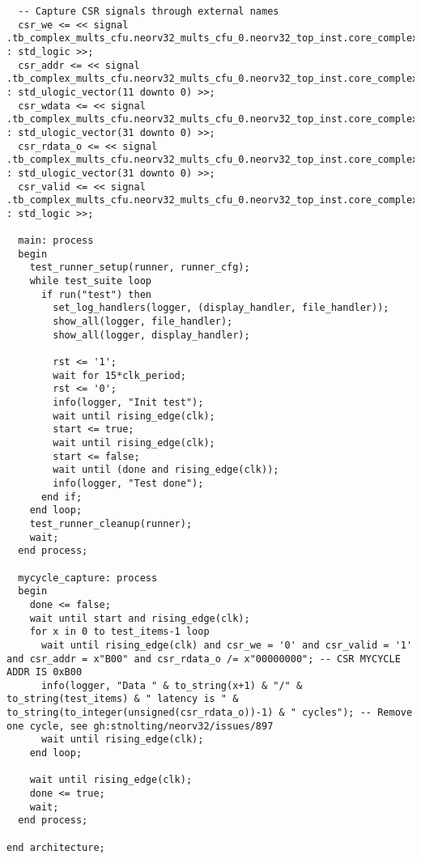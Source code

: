 \begin{code}
\begin{verbatim}
  -- Capture CSR signals through external names
  csr_we <= << signal .tb_complex_mults_cfu.neorv32_mults_cfu_0.neorv32_top_inst.core_complex.neorv32_cpu_inst.neorv32_cpu_control_inst.xcsr_we_o : std_logic >>;
  csr_addr <= << signal .tb_complex_mults_cfu.neorv32_mults_cfu_0.neorv32_top_inst.core_complex.neorv32_cpu_inst.neorv32_cpu_control_inst.xcsr_addr_o : std_ulogic_vector(11 downto 0) >>;
  csr_wdata <= << signal .tb_complex_mults_cfu.neorv32_mults_cfu_0.neorv32_top_inst.core_complex.neorv32_cpu_inst.neorv32_cpu_control_inst.xcsr_wdata_o : std_ulogic_vector(31 downto 0) >>;
  csr_rdata_o <= << signal .tb_complex_mults_cfu.neorv32_mults_cfu_0.neorv32_top_inst.core_complex.neorv32_cpu_inst.neorv32_cpu_control_inst.csr_rdata_o : std_ulogic_vector(31 downto 0) >>;
  csr_valid <= << signal .tb_complex_mults_cfu.neorv32_mults_cfu_0.neorv32_top_inst.core_complex.neorv32_cpu_inst.neorv32_cpu_control_inst.csr_reg_valid : std_logic >>;

  main: process
  begin
    test_runner_setup(runner, runner_cfg);
    while test_suite loop
      if run("test") then
        set_log_handlers(logger, (display_handler, file_handler));
        show_all(logger, file_handler);
        show_all(logger, display_handler);

        rst <= '1';
        wait for 15*clk_period;
        rst <= '0';
        info(logger, "Init test");
        wait until rising_edge(clk);
        start <= true;
        wait until rising_edge(clk);
        start <= false;
        wait until (done and rising_edge(clk));
        info(logger, "Test done");
      end if;
    end loop;
    test_runner_cleanup(runner);
    wait;
  end process;

  mycycle_capture: process
  begin
    done <= false;
    wait until start and rising_edge(clk);
    for x in 0 to test_items-1 loop
      wait until rising_edge(clk) and csr_we = '0' and csr_valid = '1' and csr_addr = x"B00" and csr_rdata_o /= x"00000000"; -- CSR MYCYCLE ADDR IS 0xB00
      info(logger, "Data " & to_string(x+1) & "/" & to_string(test_items) & " latency is " & to_string(to_integer(unsigned(csr_rdata_o))-1) & " cycles"); -- Remove one cycle, see gh:stnolting/neorv32/issues/897
      wait until rising_edge(clk);
    end loop;
    
    wait until rising_edge(clk);
    done <= true;
    wait;
  end process;

end architecture;
\end{verbatim}
\caption{tb\_complex\_mults\_cfu.vhd}
\label{ap-cod:19}
\end{code}


